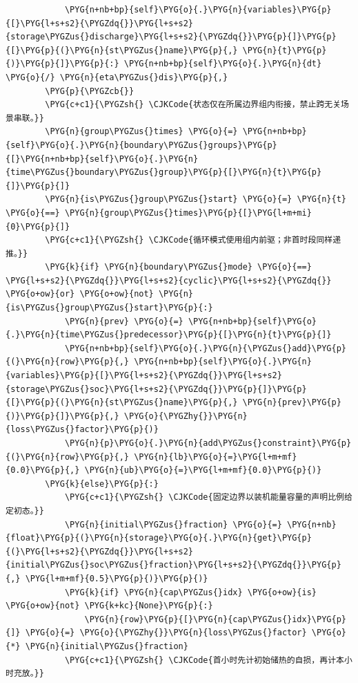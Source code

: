\begin{Verbatim}
            \PYG{n+nb+bp}{self}\PYG{o}{.}\PYG{n}{variables}\PYG{p}{[}\PYG{l+s+s2}{\PYGZdq{}}\PYG{l+s+s2}{storage\PYGZus{}discharge}\PYG{l+s+s2}{\PYGZdq{}}\PYG{p}{]}\PYG{p}{[}\PYG{p}{(}\PYG{n}{st\PYGZus{}name}\PYG{p}{,} \PYG{n}{t}\PYG{p}{)}\PYG{p}{]}\PYG{p}{:} \PYG{n+nb+bp}{self}\PYG{o}{.}\PYG{n}{dt} \PYG{o}{/} \PYG{n}{eta\PYGZus{}dis}\PYG{p}{,}
        \PYG{p}{\PYGZcb{}}
        \PYG{c+c1}{\PYGZsh{} \CJKCode{状态仅在所属边界组内衔接，禁止跨无关场景串联。}}
        \PYG{n}{group\PYGZus{}times} \PYG{o}{=} \PYG{n+nb+bp}{self}\PYG{o}{.}\PYG{n}{boundary\PYGZus{}groups}\PYG{p}{[}\PYG{n+nb+bp}{self}\PYG{o}{.}\PYG{n}{time\PYGZus{}boundary\PYGZus{}group}\PYG{p}{[}\PYG{n}{t}\PYG{p}{]}\PYG{p}{]}
        \PYG{n}{is\PYGZus{}group\PYGZus{}start} \PYG{o}{=} \PYG{n}{t} \PYG{o}{==} \PYG{n}{group\PYGZus{}times}\PYG{p}{[}\PYG{l+m+mi}{0}\PYG{p}{]}
        \PYG{c+c1}{\PYGZsh{} \CJKCode{循环模式使用组内前驱；非首时段同样递推。}}
        \PYG{k}{if} \PYG{n}{boundary\PYGZus{}mode} \PYG{o}{==} \PYG{l+s+s2}{\PYGZdq{}}\PYG{l+s+s2}{cyclic}\PYG{l+s+s2}{\PYGZdq{}} \PYG{o+ow}{or} \PYG{o+ow}{not} \PYG{n}{is\PYGZus{}group\PYGZus{}start}\PYG{p}{:}
            \PYG{n}{prev} \PYG{o}{=} \PYG{n+nb+bp}{self}\PYG{o}{.}\PYG{n}{time\PYGZus{}predecessor}\PYG{p}{[}\PYG{n}{t}\PYG{p}{]}
            \PYG{n+nb+bp}{self}\PYG{o}{.}\PYG{n}{\PYGZus{}add}\PYG{p}{(}\PYG{n}{row}\PYG{p}{,} \PYG{n+nb+bp}{self}\PYG{o}{.}\PYG{n}{variables}\PYG{p}{[}\PYG{l+s+s2}{\PYGZdq{}}\PYG{l+s+s2}{storage\PYGZus{}soc}\PYG{l+s+s2}{\PYGZdq{}}\PYG{p}{]}\PYG{p}{[}\PYG{p}{(}\PYG{n}{st\PYGZus{}name}\PYG{p}{,} \PYG{n}{prev}\PYG{p}{)}\PYG{p}{]}\PYG{p}{,} \PYG{o}{\PYGZhy{}}\PYG{n}{loss\PYGZus{}factor}\PYG{p}{)}
            \PYG{n}{p}\PYG{o}{.}\PYG{n}{add\PYGZus{}constraint}\PYG{p}{(}\PYG{n}{row}\PYG{p}{,} \PYG{n}{lb}\PYG{o}{=}\PYG{l+m+mf}{0.0}\PYG{p}{,} \PYG{n}{ub}\PYG{o}{=}\PYG{l+m+mf}{0.0}\PYG{p}{)}
        \PYG{k}{else}\PYG{p}{:}
            \PYG{c+c1}{\PYGZsh{} \CJKCode{固定边界以装机能量容量的声明比例给定初态。}}
            \PYG{n}{initial\PYGZus{}fraction} \PYG{o}{=} \PYG{n+nb}{float}\PYG{p}{(}\PYG{n}{storage}\PYG{o}{.}\PYG{n}{get}\PYG{p}{(}\PYG{l+s+s2}{\PYGZdq{}}\PYG{l+s+s2}{initial\PYGZus{}soc\PYGZus{}fraction}\PYG{l+s+s2}{\PYGZdq{}}\PYG{p}{,} \PYG{l+m+mf}{0.5}\PYG{p}{)}\PYG{p}{)}
            \PYG{k}{if} \PYG{n}{cap\PYGZus{}idx} \PYG{o+ow}{is} \PYG{o+ow}{not} \PYG{k+kc}{None}\PYG{p}{:}
                \PYG{n}{row}\PYG{p}{[}\PYG{n}{cap\PYGZus{}idx}\PYG{p}{]} \PYG{o}{=} \PYG{o}{\PYGZhy{}}\PYG{n}{loss\PYGZus{}factor} \PYG{o}{*} \PYG{n}{initial\PYGZus{}fraction}
            \PYG{c+c1}{\PYGZsh{} \CJKCode{首小时先计初始储热的自损，再计本小时充放。}}

\end{Verbatim}
